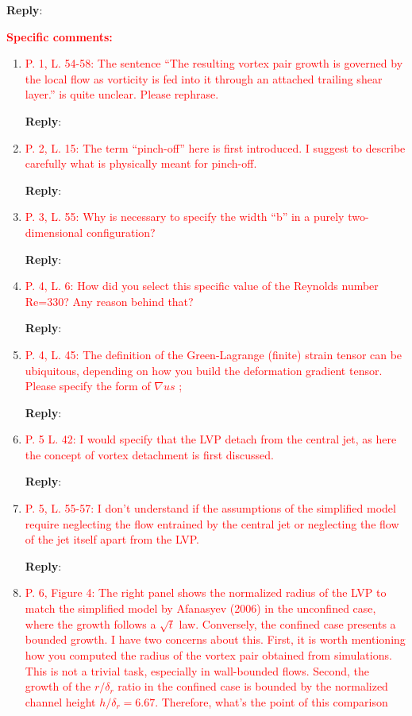 \documentclass[onecolumn,a4paper,amsmath,amssym,pre]{revtex4}
\begin{document}
{\begin{itemize}
\textbf{Reply}:
\\
\end{itemize}

\textcolor{red}{\textbf{Specific comments:}}\\

\begin{enumerate}
	
	\item \textcolor{red}{P. 1, L. 54-58: The sentence “The resulting vortex pair growth is governed by the local flow as vorticity is fed into it through an attached trailing shear layer.” is quite unclear. Please rephrase.}
	
	\textbf{Reply}:
	
	\item \textcolor{red}{P. 2, L. 15: The term “pinch-off” here is first introduced. I suggest to describe carefully what is physically meant for pinch-off.}
	
	\textbf{Reply}:
	
	\item \textcolor{red}{P. 3, L. 55: Why is necessary to specify the width “b” in a purely two-dimensional configuration?}
	
	\textbf{Reply}:
	
	\item \textcolor{red}{P. 4, L. 6: How did you select this specific value of the Reynolds number Re=330? Any reason behind that?}
	
	\textbf{Reply}:
	
	\item \textcolor{red}{P. 4, L. 45: The definition of the Green-Lagrange (finite) strain tensor can be ubiquitous, depending on how you build the deformation gradient tensor. Please specify the form of $\nabla us$ ;}
	
	\textbf{Reply}:
	
	\item \textcolor{red}{P. 5 L. 42: I would specify that the LVP detach from the central jet, as here the concept of	vortex detachment is first discussed.}
	
	\textbf{Reply}:
	
	\item \textcolor{red}{P. 5, L. 55-57: I don’t understand if the assumptions of the simplified model require neglecting the flow entrained by the central jet or neglecting the flow of the jet itself apart from the LVP.}
	
	\textbf{Reply}:
	
	\item \textcolor{red}{P. 6, Figure 4: The right panel shows the normalized radius of the LVP to match the simplified model by Afanasyev (2006) in the unconfined case, where the growth follows a $\sqrt{t}$ law. Conversely, the confined case presents a bounded growth. I have two concerns about this. First, it is worth mentioning how you computed the radius of the vortex pair obtained from simulations. This is not a trivial task, especially in wall-bounded flows. Second, the growth of the $r/\delta_r$ ratio in the confined case is bounded by the normalized channel height $h/\delta_r= 6.67$. Therefore, what’s the point of this comparison}
	

\end{enumerate}}
\end{document}
